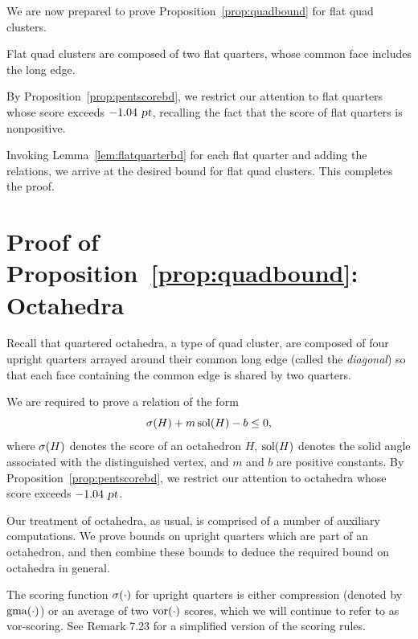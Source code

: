 We are now prepared to prove Proposition~\ref{prop:quadbound} for flat quad clusters.

Flat quad clusters are composed of two flat quarters, whose common face
includes the long edge.

By Proposition~\ref{prop:pentscorebd}, we restrict our attention to
flat quarters whose score exceeds $-1.04 \text{ \sl pt}$, recalling the
fact that the score of flat quarters is nonpositive.

Invoking Lemma~\ref{lem:flatquarterbd} for each flat quarter and adding the relations,
we arrive at the desired
bound for flat quad clusters.  This completes the proof.


\section{Proof of Proposition~\ref{prop:quadbound}: Octahedra}


Recall that quartered octahedra, a type of quad cluster,
are composed of four upright
quarters arrayed around their common long edge
(called the {\em diagonal}) so that each
face containing the common edge is shared by two quarters.

We are required to prove a relation of the form
\[ \operatorname{\sigma}(H) + m \operatorname{sol}(H) - b \le 0, \]
where $\operatorname{\sigma}(H)$ denotes the score of an octahedron $H$, $\operatorname{sol}(H)$ denotes
the solid angle associated with the distinguished vertex, and $m$
and $b$ are positive constants.  By Proposition~\ref{prop:pentscorebd},
we restrict our attention to
octahedra whose score exceeds $-1.04 \text{ \sl pt}$.

Our treatment of octahedra, as usual, is comprised of a number of auxiliary
computations.  We prove bounds on upright quarters which are part of an
octahedron, and then combine these bounds to deduce the required bound on
octahedra in general.

The scoring function $\operatorname{\sigma}(\cdot)$ for upright quarters is either compression
(denoted by $\operatorname{gma}(\cdot)$) or
an average of two $\operatorname{vor}(\cdot)$ scores, which we will continue to refer to as
vor-scoring.
See Remark 7.23 for a simplified version of the scoring rules.

